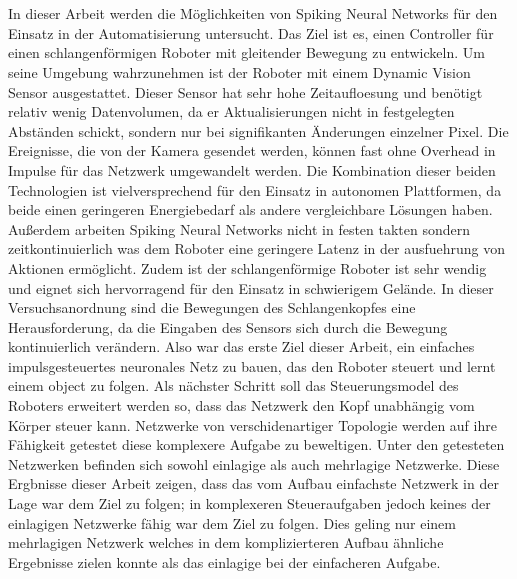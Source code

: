 \chapter{\abstractname}
In dieser Arbeit werden die Möglichkeiten von Spiking Neural Networks für den Einsatz in der Automatisierung untersucht. Das Ziel ist es, einen Controller für einen schlangenförmigen Roboter mit gleitender Bewegung zu entwickeln. Um seine Umgebung wahrzunehmen ist der Roboter mit einem Dynamic Vision Sensor ausgestattet. Dieser Sensor hat sehr hohe Zeitaufloesung und benötigt relativ wenig Datenvolumen, da er Aktualisierungen nicht in festgelegten Abständen schickt, sondern nur bei signifikanten Änderungen einzelner Pixel. Die Ereignisse, die von der Kamera gesendet werden, können fast ohne Overhead in Impulse für das Netzwerk umgewandelt werden. Die Kombination dieser beiden Technologien ist vielversprechend für den Einsatz in autonomen Plattformen, da beide einen geringeren Energiebedarf als andere vergleichbare Lösungen haben. Außerdem arbeiten Spiking Neural Networks nicht in festen takten sondern zeitkontinuierlich was dem Roboter eine geringere Latenz in der ausfuehrung von Aktionen ermöglicht. Zudem ist der schlangenförmige Roboter ist sehr wendig und eignet sich hervorragend für den Einsatz in schwierigem Gelände.
In dieser Versuchsanordnung sind die Bewegungen des Schlangenkopfes eine Herausforderung, da die Eingaben des Sensors sich durch die Bewegung kontinuierlich verändern. Also war das erste Ziel dieser Arbeit, ein einfaches impulsgesteuertes neuronales Netz zu bauen, das den Roboter steuert und lernt einem object zu folgen. Als nächster Schritt soll das Steuerungsmodel des Roboters erweitert werden so, dass das Netzwerk den Kopf unabhängig vom Körper steuer kann. Netzwerke von verschidenartiger Topologie werden auf ihre Fähigkeit getestet diese komplexere Aufgabe zu beweltigen. Unter den getesteten Netzwerken befinden sich sowohl einlagige als auch mehrlagige Netzwerke.
Diese Ergbnisse dieser Arbeit zeigen, dass das vom Aufbau einfachste Netzwerk in der Lage war dem Ziel zu folgen; in komplexeren Steueraufgaben jedoch keines der einlagigen Netzwerke fähig war dem Ziel zu folgen. Dies geling nur einem mehrlagigen Netzwerk welches in dem komplizierteren Aufbau ähnliche Ergebnisse zielen konnte als das einlagige
bei der einfacheren Aufgabe.



